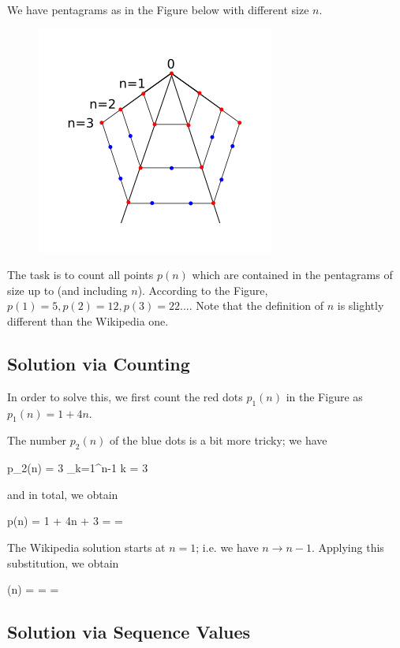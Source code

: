 
We have pentagrams as in the Figure below with different size $n$. 

\begin{figure}[H]
	\includegraphics[scale=1.3]{images/pentagon_numbers.png}
\end{figure}

The task is to count all points $p(n)$ which are contained in the pentagrams of size up to (and including $n$). According to the Figure, $p(1) = 5, p(2) = 12, p(3) = 22...$. Note that the definition of $n$ is slightly different than the Wikipedia one.

\subsection{Solution via Counting}

In order to solve this, we first count the red dots $p_1(n)$ in the Figure as $p_1(n) = 1 + 4n$.

The number $p_2(n)$ of the blue dots is a bit more tricky; we have

\bee
p_2(n) = 3 \sum_{k=1}^{n-1} k = 3 
\eee

and in total, we obtain

\be
\label{eq:2018-02-08-1}
p(n) = 1 + 4n + 3  = \cdots = 
\ee

The Wikipedia solution starts at $n=1$; i.e. we have $n \rightarrow n-1$. Applying this substitution, we obtain

\bee
{}(n) =  = \cdots = 
\eee


\subsection{Solution via Sequence Values}

